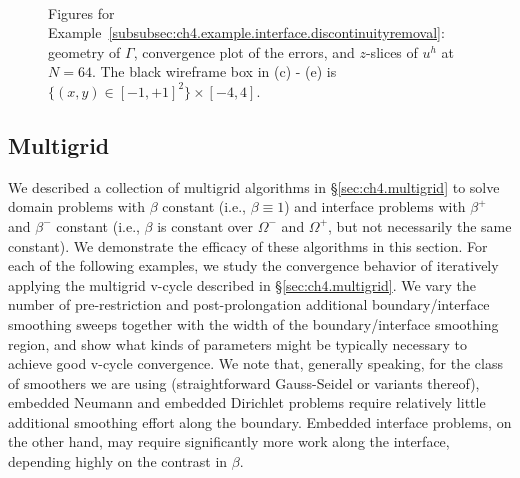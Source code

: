 \setlength{\figureheighti}{0.40\columnwidth}
\setlength{\figurewidthii}{0.32\columnwidth}
\begin{figure}[htbp]
\begin{center}
 \\
\caption{Figures for Example~\ref{subsubsec:ch4.example.interface.discontinuityremoval}: geometry of $\Gamma$, convergence plot of the errors, and $z$-slices of $u^h$ at $N = 64$. The black wireframe box in (c) - (e) is $\{(x,y) \in [-1,+1]^2\} \times [-4,4]$.}
\label{fig:ch4.example.interface.discontinuityremoval}
\end{center}
\end{figure}

\subsection{Multigrid} \label{subsec:ch4.examples.multigrid}

We described a collection of multigrid algorithms in \S\ref{sec:ch4.multigrid} to solve domain problems with $\beta$ constant (i.e., $\beta \equiv 1$) and interface problems with $\beta^+$ and $\beta^-$ constant (i.e., $\beta$ is constant over $\Omega^-$ and $\Omega^+$, but not necessarily the same constant). We demonstrate the efficacy of these algorithms in this section. For each of the following examples, we study the convergence behavior of iteratively applying the multigrid v-cycle described in \S\ref{sec:ch4.multigrid}. We vary the number of pre-restriction and post-prolongation additional boundary/interface smoothing sweeps together with the width of the boundary/interface smoothing region, and show what kinds of parameters might be typically necessary to achieve good v-cycle convergence. We note that, generally speaking, for the class of smoothers we are using (straightforward Gauss-Seidel or variants thereof), embedded Neumann and embedded Dirichlet problems require relatively little additional smoothing effort along the boundary. Embedded interface problems, on the other hand, may require significantly more work along the interface, depending highly on the contrast in $\beta$.

